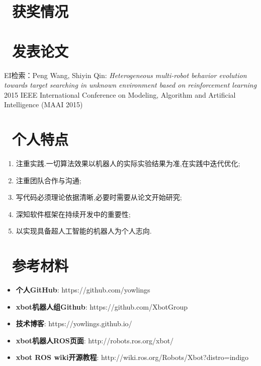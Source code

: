 \documentclass{resume}
\begin{document}
\section{\faGratipay\ 获奖情况}

\section{\faBook\ 发表论文}
EI检索：Peng Wang, Shiyin Qin:
\textit{Heterogeneous multi-robot behavior evolution towards target searching in unknown environment based on reinforcement learning} 
2015 IEEE International Conference on Modeling, Algorithm and Artificial Intelligence (MAAI 2015)

\section{\faCommenting\ 个人特点}
\begin{enumerate}
  \item 注重实践.一切算法效果以机器人的实际实验结果为准,在实践中迭代优化;
  \item 注重团队合作与沟通;
  \item 写代码必须理论依据清晰,必要时需要从论文开始研究;
  \item 深知软件框架在持续开发中的重要性;
  \item 以实现具备超人工智能的机器人为个人志向.
\end{enumerate}
\section{\faInfoCircle\ 参考材料}
\begin{itemize}[parsep=0.5ex]  
  \item \textbf{个人GitHub}: https://github.com/yowlings
  \item \textbf{xbot机器人组Github}: https://github.com/XbotGroup
  \item \textbf{技术博客}: https://yowlings.github.io/
  \item \textbf{xbot机器人ROS页面}: http://robots.ros.org/xbot/
  \item \textbf{xbot ROS wiki开源教程}: http://wiki.ros.org/Robots/Xbot?distro=indigo
\end{itemize}

% 
\end{document}
